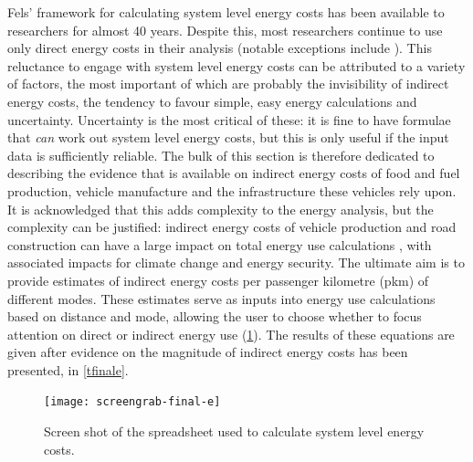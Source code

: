 Fels' framework for calculating system level energy costs has been available
to researchers for almost 40 years. Despite this, most researchers
continue to use only direct energy
costs in their analysis (notable exceptions include
\citealp{Treloar2004, Lenzen1999, MacKay2009, Lovelace2011-assessing}). %
This reluctance to engage with system level energy
costs can be attributed to a variety of factors, the most important
of which are probably the invisibility of indirect energy costs,
the tendency to favour simple, easy energy calculations and uncertainty.
Uncertainty is the most critical of these: it is fine to have formulae
that \emph{can} work out
system level energy costs, but this is only useful if the input data is
sufficiently reliable. The bulk of this section is therefore dedicated
to describing the evidence that is available on indirect energy costs of food
and fuel production, vehicle manufacture and the infrastructure these
vehicles rely upon. It is acknowledged that this adds complexity to the energy
analysis, but the complexity can be justified: indirect
energy costs of vehicle production and road construction can have a large
impact on total energy use calculations
\citep{Lovelace2011-assessing, Lenzen1999, Wee2000}, with associated impacts
for climate change and energy security. The ultimate aim is to provide
estimates of indirect energy costs per passenger kilometre (pkm) of
different modes. These estimates serve as inputs into energy use
calculations based on distance and mode, allowing the user to choose whether
to focus attention on direct or indirect energy use (\cref{screengrab-final-e}).
The results of these equations are given after evidence on
the magnitude of indirect energy costs has been presented, in \cref{tfinale}.

\begin{figure}[t]
 \begin{center}
 \texttt{[image: screengrab-final-e]}
\end{center}
 \caption{Screen shot of the spreadsheet used to calculate system level energy
 costs.}
 \label{screengrab-final-e}
\end{figure}


